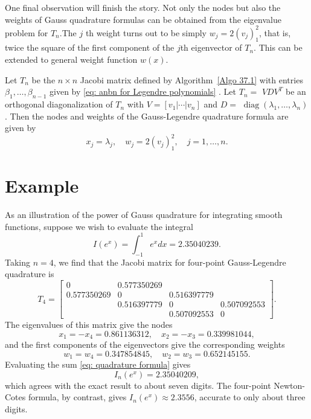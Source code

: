  One final observation will finish the story. Not only the nodes but also the weights of Gauss quadrature formulas can be obtained from the eigenvalue problem for $ T_n $.The $ j$ th weight turns out to be simply $ w_j = 2(v_j)_1^{2}  $, that is, twice the square of the first component of the $ j $th eigenvector of $ T_n $. This can be extended to general weight function $ w(x) $. 

 
 \begin{theorem}
 \label{thm: Gauss-Legendre quadrature formula}
Let $T_n$ be the $n \times n$ Jacobi matrix defined by Algorithm~\ref{Algo 37.1} with entries $\beta_1, \ldots, \beta_{n-1}$ given by \eqref{eq: anbn for Legendre polynomials} . Let $T_n=$ $V D V^T$ be an orthogonal diagonalization of $T_n$ with $V=\left[v_1|\cdots| v_n\right]$ and $D=$ $\operatorname{diag}\left(\lambda_1, \ldots, \lambda_n\right)$. Then the nodes and weights of the Gauss-Legendre quadrature formula are given by
$$
x_j=\lambda_j, \quad w_j=2\left(v_j\right)_1^2, \quad j=1, \ldots, n .
$$
 \end{theorem}

 \section{Example} 
 As an illustration of the power of Gauss quadrature for integrating smooth functions, suppose we wish to evaluate the integral
$$
I\left(e^x\right)=\int_{-1}^1 e^x d x=2.35040239 .
$$
Taking $n=4$, we find that the Jacobi matrix for four-point Gauss-Legendre quadrature is
$$
T_4=\left[\begin{array}{cccc}
0 & 0.577350269 & & \\
0.577350269 & 0 & 0.516397779 & \\
& 0.516397779 & 0 & 0.507092553 \\
& & 0.507092553 & 0
\end{array}\right] .
$$
The eigenvalues of this matrix give the nodes
$$
x_1=-x_4=0.861136312, \quad x_2=-x_3=0.339981044,
$$
and the first components of the eigenvectors give the corresponding weights
$$
w_1=w_4=0.347854845, \quad w_2=w_3=0.652145155 .
$$
Evaluating the sum \eqref{eq: quadrature formula} gives
$$
I_n\left(e^x\right)=2.35040209,
$$
which agrees with the exact result to about seven digits. The four-point Newton-Cotes formula, by contrast, gives $I_n\left(e^x\right) \approx 2.3556$, accurate to only about three digits. 
 
  
